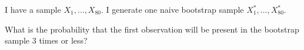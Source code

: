 
\begin{question}
I have a sample \(X_1, \ldots, X_{80}\).
I generate one naive bootstrap sample \(X^*_1, \ldots, X^*_{80}\).

What is the probability that the first observation will be present in the bootstrap sample 3 times or less?

\end{question}


